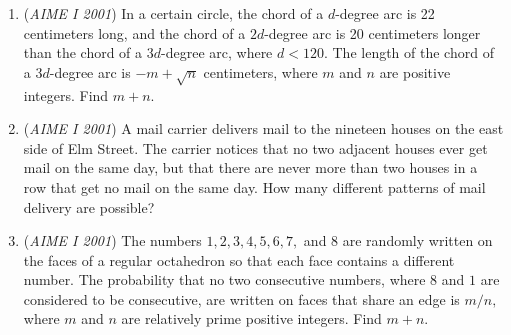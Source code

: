 \begin{enumerate}
	\item (\textit{AIME I 2001}) In a certain circle, the chord of a $d$-degree arc is 22 centimeters long, and the chord of a $2d$-degree arc is 20 centimeters longer than the chord of a $3d$-degree arc, where $d < 120.$  The length of the chord of a $3d$-degree arc is $- m + \sqrt {n}$ centimeters, where $m$ and $n$ are positive integers.  Find $m + n.$


	\item (\textit{AIME I 2001}) A mail carrier delivers mail to the nineteen houses on the east side of Elm Street.  The carrier notices that no two adjacent houses ever get mail on the same day, but that there are never more than two houses in a row that get no mail on the same day.  How many different patterns of mail delivery are possible?


 

	\item (\textit{AIME I 2001}) The numbers $1, 2, 3, 4, 5, 6, 7,$ and $8$ are randomly written on the faces of a regular octahedron so that each face contains a different number.  The probability that no two consecutive numbers, where $8$ and $1$ are considered to be consecutive, are written on faces that share an edge is $m/n,$ where $m$ and $n$ are relatively prime positive integers.  Find $m + n.$


\end{enumerate}